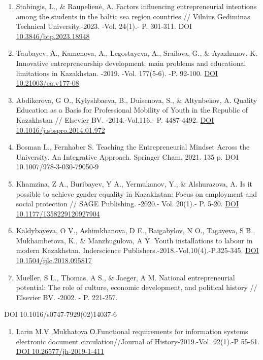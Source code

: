 \begin{references}
\begin{enumerate}
\def\labelenumi{\arabic{enumi}.}
\setcounter{enumi}{3}
\item
  Stabingis, L., \& Raupelienė, A. Factors influencing entrepreneurial
  intentions among the students in the baltic sea region countries //
  Vilnius Gediminas Technical University.-2023. -Vol. 24(1).- P.
  301-311. DOI
  \href{https://doi.org/10.3846/btp.2023.18948}{10.3846/btp.2023.18948}
\item
  Taubayev, А., Kamenova, A., Legostayeva, A., Srailova, G., \&
  Ayazhanov, K. Innovative entrepreneurship development: main problems
  and educational limitations in Kazakhstan. -2019. -Vol. 177(5-6). -P.
  92-100. \href{https://doi.org/10.21003/ea.v177-08}{DOI
  10.21003/ea.v177-08}
\item
  Abdikerova, G O., Kylyshbaeva, B., Duisenova, S., \& Altynbekov, A.
  Quality Education as a Basis for Professional Mobility of Youth in the
  Republic of Kazakhstan // Elsevier BV. -2014.-Vol.116.- P. 4487-4492.
  \href{https://doi.org/10.1016/j.sbspro.2014.01.972}{DOI
  10.1016/j.sbspro.2014.01.972}
\item
  Bosman L., Fernhaber S. Teaching the Entrepreneurial Mindset Across
  the University. An Integrative Approach. Springer Cham, 2021. 135 p.
  DOI 10.1007/978-3-030-79050-9
\item
  Khamzina, Z A., Buribayev, Y A., Yermukanov, Y., \& Alshurazova, A. Is
  it possible to achieve gender equality in Kazakhstan: Focus on
  employment and social protection // SAGE Publishing. -2020.- Vol.
  20(1).- P. 5-20. \href{https://doi.org/10.1177/1358229120927904}{DOI
  10.1177/1358229120927904}
\item
  Kaldybayeva, O V., Ashimkhanova, D E., Baigabylov, N O., Tagayeva, S
  B., Mukhambetova, K., \& Manzhugulova, A Y. Youth installations to
  labour in modern Kazakhstan. Inderscience
  Publishers.-2018.-Vol.10(4).-P.325-345.
  \href{https://doi.org/10.1504/ijlc.2018.095817}{DOI
  10.1504/ijlc.2018.095817}
\item
  Mueller, S L., Thomas, A S., \& Jaeger, A M. National entrepreneurial
  potential: The role of culture, economic development, and political
  history // Elsevier BV. -2002. - P. 221-257.
\end{enumerate}

DOI 10.1016/s0747-7929(02)14037-6

\begin{enumerate}
\def\labelenumi{\arabic{enumi}.}
\setcounter{enumi}{10}
\item
  Larin M.V.,Мukhatova О.Functional requirements for information systems
  electronic document circulation//Journal of History-2019.-Vol.
  92(1).-P 55-61. \href{https://doi.org/10.26577/jh-2019-1-411}{DOI
  10.26577/jh-2019-1-411}
\end{enumerate}
\end{references}
